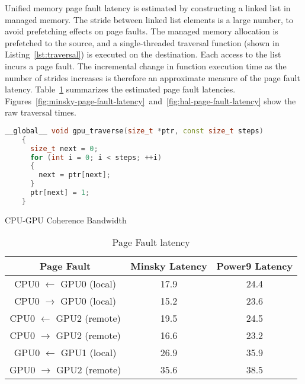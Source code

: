 Unified memory page fault latency is estimated by constructing a linked list in managed memory.
The stride between linked list elements is a large number, to avoid prefetching effects on page faults.
The managed memory allocation is prefetched to the source, and a single-threaded traversal function (shown in Listing~\ref{lst:traversal}) is executed on the destination.
Each access to the list incurs a page fault.
The incremental change in function execution time as the number of strides increases is therefore an approximate measure of the page fault latency.
Table~\ref{tab:page-fault-latency} summarizes the estimated page fault latencies.
Figures~\ref{fig:minsky-page-fault-latency}~and~\ref{fig:hal-page-fault-latency} show the raw traversal times.

\begin{lstlisting}[language=c++, caption=Linked List Traversal, label=lst:traversal]
    __global__ void gpu_traverse(size_t *ptr, const size_t steps)
    {
      size_t next = 0;
      for (int i = 0; i < steps; ++i)
      {
        next = ptr[next];
      }
      ptr[next] = 1;
    }
\end{lstlisting}

\begin{algorithm}
    \caption{CPU-GPU Coherence Bandwidth}
    \label{alg:um-coherence-bw}
    \begin{algorithmic}[1]
    \Statex

    \EndFunction

    \end{algorithmic}
\end{algorithm}


\begin{table}[h]
	\centering
	\caption[]{Page Fault latency}
	\label{tab:page-fault-latency}
	\begin{tabular}{|c|c|c|}
		\hline
		\textbf{Page Fault} & \textbf{Minsky Latency} & \textbf{Power9 Latency} \\ \hline
		CPU0 $\leftarrow$ GPU0  (local) & 17.9 & 24.4   \\ \hline
        CPU0 $\rightarrow$ GPU0 (local) & 15.2 & 23.6  \\ \hline
        CPU0 $\leftarrow$ GPU2  (remote) & 19.5 & 24.5   \\ \hline
        CPU0 $\rightarrow$ GPU2 (remote) & 16.6 & 23.2  \\ \hline
        GPU0 $\leftarrow$ GPU1  (local) & 26.9 & 35.9   \\ \hline
		GPU0 $\rightarrow$ GPU2 (remote) & 35.6 & 38.5  \\ \hline
	\end{tabular}
\end{table}


